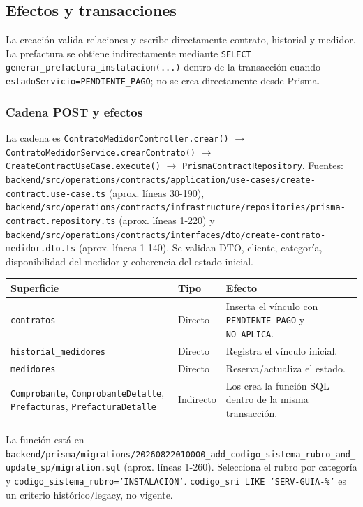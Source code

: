 \subsection{Efectos y transacciones}


La creación valida relaciones y escribe directamente contrato, historial y medidor. La prefactura se obtiene indirectamente mediante \texttt{SELECT generar\_prefactura\_instalacion(...)} dentro de la transacción cuando \texttt{estadoServicio=PENDIENTE\_PAGO}; no se crea directamente desde Prisma.

\subsubsection{Cadena POST y efectos}
La cadena es \texttt{ContratoMedidorController.crear()} $\rightarrow$ \texttt{ContratoMedidorService.crearContrato()} $\rightarrow$ \texttt{CreateContractUseCase.execute()} $\rightarrow$ \texttt{PrismaContractRepository}. Fuentes: \texttt{backend/src/operations/contracts/application/use-cases/create-contract.use-case.ts} (aprox. líneas 30-190), \texttt{backend/src/operations/contracts/infrastructure/repositories/prisma-contract.repository.ts} (aprox. líneas 1-220) y \texttt{backend/src/operations/contracts/interfaces/dto/create-contrato-medidor.dto.ts} (aprox. líneas 1-140). Se validan DTO, cliente, categoría, disponibilidad del medidor y coherencia del estado inicial.

\begin{center}\small
\begin{longtable}{|p{}|p{}|p{}|}
\hline
\textbf{Superficie} & \textbf{Tipo} & \textbf{Efecto} \\
\hline
\texttt{contratos} & Directo & Inserta el vínculo con \texttt{PENDIENTE\_PAGO} y \texttt{NO\_APLICA}. \\
\hline
\texttt{historial\_medidores} & Directo & Registra el vínculo inicial. \\
\hline
\texttt{medidores} & Directo & Reserva/actualiza el estado. \\
\hline
\texttt{Comprobante}, \texttt{ComprobanteDetalle}, \texttt{Prefacturas}, \texttt{PrefacturaDetalle} & Indirecto & Los crea la función SQL dentro de la misma transacción. \\
\hline
\end{longtable}\end{center}

La función está en \texttt{backend/prisma/migrations/20260822010000\_add\_codigo\_sistema\_rubro\_and\_update\_sp/migration.sql} (aprox. líneas 1-260). Selecciona el rubro por categoría y \texttt{codigo\_sistema\_rubro='INSTALACION'}. \texttt{codigo\_sri LIKE 'SERV-GUIA-\%'} es un criterio histórico/legacy, no vigente.

